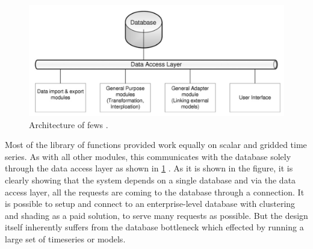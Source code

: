 \begin{figure}[htp]
    \centering
    \includegraphics[width=1.0\textwidth]{lit/fews/Architecture-of-Delft-FEWS-showing-the-data-base-the-data-access-layers-and-examples-of_W640.png}
    \caption[Architecture of \acrshort{fews}]{Architecture of \acrshort{fews} \cite{Werner2013TheSystem}.}
    \label{fi:fews_data_layer}
\end{figure}
Most of the library of functions provided work equally on scalar and gridded time series. As with all other modules, this communicates with the database solely through the data access layer as shown in \cref{fi:fews_data_layer} \cite{Werner2013TheSystem}. As it is shown in the figure, it is clearly showing that the system depends on a single database and via the data access layer, all the requests are coming to the database through a connection. It is possible to setup and connect to an enterprise-level database with clustering and shading as a paid solution, to serve many requests as possible. But the design itself inherently suffers from the database bottleneck which effected by running a large set of timeseries or models.

